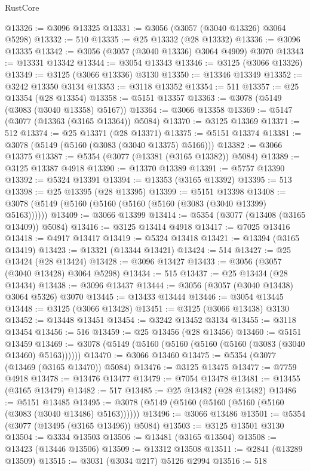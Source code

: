 \begin{lexlean}{RustCore}
\begin{coremodule}
@13326 := @3096 @13325
@13331 := @3056 (@3057 (@3040 @13326) @3064 @5298)
@13332 := 510
@13335 := @25 @13332 (@28 @13332)
@13336 := @3096 @13335
@13342 := @3056 (@3057 (@3040 @13336) @3064 @4909) @3070
@13343 := @13331 @13342
@13344 := @3054 @13343
@13346 := @3125 (@3066 @13326)
@13349 := @3125 (@3066 @13336) @3130
@13350 := @13346 @13349
@13352 := @3242 @13350 @3134
@13353 := @3118 @13352
@13354 := 511
@13357 := @25 @13354 (@28 @13354)
@13358 := @5151 @13357
@13363 := @3078 (@5149 (@3083 (@3040 @13358) @5167))
@13364 := @3066 @13358
@13369 := @5147 (@3077 (@13363 (@3165 @13364)) @5084)
@13370 := @3125 @13369
@13371 := 512
@13374 := @25 @13371 (@28 @13371)
@13375 := @5151 @13374
@13381 := @3078 (@5149 (@5160 (@3083 (@3040 @13375) @5166)))
@13382 := @3066 @13375
@13387 := @5354 (@3077 (@13381 (@3165 @13382)) @5084)
@13389 := @3125 @13387 @4918
@13390 := @13370 @13389
@13391 := @5757 @13390
@13392 := @5324 @13391
@13394 := @13353 (@3165 @13392)
@13395 := 513
@13398 := @25 @13395 (@28 @13395)
@13399 := @5151 @13398
@13408 := @3078 (@5149 (@5160 (@5160 (@5160 (@5160 (@3083 (@3040 @13399) @5163))))))
@13409 := @3066 @13399
@13414 := @5354 (@3077 (@13408 (@3165 @13409)) @5084)
@13416 := @3125 @13414 @4918
@13417 := @7025 @13416
@13418 := @4917 @13417
@13419 := @5324 @13418
@13421 := @13394 (@3165 @13419)
@13423 := @13321 (@13344 @13421)
@13424 := 514
@13427 := @25 @13424 (@28 @13424)
@13428 := @3096 @13427
@13433 := @3056 (@3057 (@3040 @13428) @3064 @5298)
@13434 := 515
@13437 := @25 @13434 (@28 @13434)
@13438 := @3096 @13437
@13444 := @3056 (@3057 (@3040 @13438) @3064 @5326) @3070
@13445 := @13433 @13444
@13446 := @3054 @13445
@13448 := @3125 (@3066 @13428)
@13451 := @3125 (@3066 @13438) @3130
@13452 := @13448 @13451
@13454 := @3242 @13452 @3134
@13455 := @3118 @13454
@13456 := 516
@13459 := @25 @13456 (@28 @13456)
@13460 := @5151 @13459
@13469 := @3078 (@5149 (@5160 (@5160 (@5160 (@5160 (@3083 (@3040 @13460) @5163))))))
@13470 := @3066 @13460
@13475 := @5354 (@3077 (@13469 (@3165 @13470)) @5084)
@13476 := @3125 @13475
@13477 := @7759 @4918
@13478 := @13476 @13477
@13479 := @7054 @13478
@13481 := @13455 (@3165 @13479)
@13482 := 517
@13485 := @25 @13482 (@28 @13482)
@13486 := @5151 @13485
@13495 := @3078 (@5149 (@5160 (@5160 (@5160 (@5160 (@3083 (@3040 @13486) @5163))))))
@13496 := @3066 @13486
@13501 := @5354 (@3077 (@13495 (@3165 @13496)) @5084)
@13503 := @3125 @13501 @3130
@13504 := @3334 @13503
@13506 := @13481 (@3165 @13504)
@13508 := @13423 (@13446 @13506)
@13509 := @13312 @13508
@13511 := @2841 (@13289 @13509)
@13515 := @3031 (@3034 @217) @5126 @2994
@13516 := 518

\end{coremodule}
\end{lexlean}
